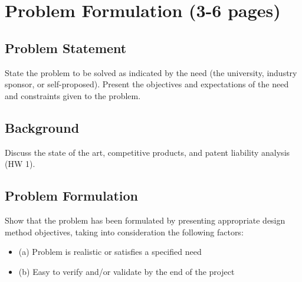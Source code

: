 \documentclass[12pt]{article}
\begin{document}
\section{Problem Formulation (3-6 pages)}
\subsection{Problem Statement}
State the problem to be solved as indicated by the need (the university, industry sponsor, or self-proposed). Present the objectives and expectations of the need and constraints given to the problem.

\subsection{Background}
Discuss the state of the art, competitive products, and patent liability analysis (HW 1).

\subsection{Problem Formulation}
Show that the problem has been formulated by presenting appropriate design method objectives, taking into consideration the following factors:
\begin{itemize}[noitemsep]
    \item (a) Problem is realistic or satisfies a specified need
    \item (b) Easy to verify and/or validate by the end of the project
\end{itemize}

\end{document}
